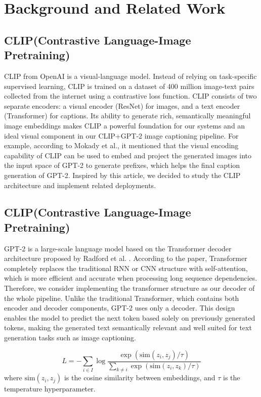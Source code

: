 \documentclass[11pt]{article}
\begin{document}
\section{Background and Related Work}

\subsection{CLIP(Contrastive Language-Image Pretraining)}
CLIP from OpenAI is a visual-language model. Instead of relying on 
task-specific supervised learning, CLIP is trained on a dataset of 400
 million image-text pairs collected from the internet using a contrastive 
 loss function. CLIP consists of two separate encoders: a visual encoder 
 (ResNet) for images, and a text encoder (Transformer) for captions. 
 Its ability to generate rich, semantically meaningful image 
 embeddings makes CLIP a powerful foundation for our systems and 
 an ideal visual component in our CLIP+GPT-2 image captioning pipeline. 
 For example, according to Mokady et al.\cite{Mokady2021}, it mentioned that the visual encoding capability of 
 CLIP can be used to embed and project the generated images into the input 
 space of GPT-2 to generate prefixes, which helps the final caption generation of GPT-2. Inspired by this article, we decided to study the CLIP architecture and implement related deployments.

 \subsection{CLIP(Contrastive Language-Image Pretraining)}
 GPT-2 is a large-scale language model based on the Transformer 
 decoder architecture proposed by Radford et al. \cite{Radford}. 
 According to the paper, Transformer completely replaces the traditional RNN or 
 CNN structure with self-attention, which is more efficient and accurate when processing 
 long sequence dependencies. Therefore, we consider implementing the transformer 
 structure as our decoder of the whole pipeline. Unlike the traditional 
 Transformer, which contains both encoder and decoder components, 
 GPT-2 uses only a decoder. This design enables the model to predict the next token based solely on previously generated tokens, 
 making the generated text semantically relevant and well suited for text generation tasks such as image captioning.


\begin{equation}
L = -\sum_{i \in I} \log \frac{\exp(\text{sim}(z_i, z_j)/\tau)}{\sum_{k \neq i}\exp(\text{sim}(z_i, z_k)/\tau)}
\end{equation}
where $\text{sim}(z_i, z_j)$ is the cosine similarity between embeddings, and $\tau$ is the temperature hyperparameter.
\end{document}
